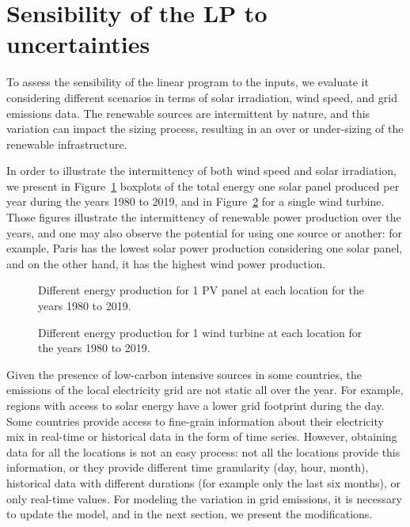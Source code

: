 \section{Sensibility of the LP to  uncertainties}
\label{sec:sensitivity}

To assess the sensibility of the linear program to the inputs, we evaluate it considering different scenarios in terms of solar irradiation, wind speed, and grid emissions data. The renewable sources are intermittent by nature, and this variation can impact the sizing process, resulting in an over or under-sizing of the renewable infrastructure.


In order to illustrate the intermittency of both wind speed and solar irradiation, we present in Figure~\ref{fig:pv_boxplots} boxplots of the total energy one solar panel produced per year during the years 1980 to 2019, and in Figure~\ref{fig:wt_boxplots} for a single wind turbine. Those figures illustrate the intermittency of renewable power production over the years, and one may also observe the potential for using one source or another: for example, Paris has the lowest solar power production considering one solar panel, and on the other hand, it has the highest wind power production. 


\begin{figure}[H]
  \centering
  {}
  \caption{Different energy production for 1 PV panel at each location for the years 1980 to 2019.}
  \label{fig:pv_boxplots}
\end{figure}


\begin{figure}[H]
  \centering
  {}
  \caption{Different energy production for 1 wind turbine at each location for the years 1980 to 2019.}
  \label{fig:wt_boxplots}
\end{figure}



Given the presence of low-carbon intensive sources in some countries, the emissions of the local electricity grid are not static all over the year. For example, regions with access to solar energy have a lower grid footprint during the day. Some countries provide access to fine-grain information about their electricity mix in real-time or historical data in the form of time series. However, obtaining data for all the locations is not an easy process: not all the locations provide this information, or they provide different time granularity (day, hour, month), historical data with different durations (for example only the last six months), or only real-time values. For modeling the variation in grid emissions, it is necessary to update the model, and in the next section, we present the modifications.


